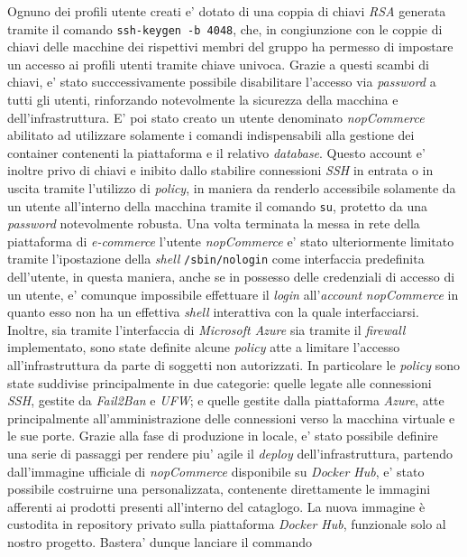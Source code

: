 \documentclass[a4paper]{report}
\begin{document}
		Ognuno dei profili utente creati e' dotato di una coppia di chiavi \emph{RSA} generata tramite il comando
		\texttt{ssh-keygen -b 4048}, che, in congiunzione con le coppie di chiavi delle macchine dei rispettivi membri
		del gruppo ha permesso di impostare un accesso ai profili utenti tramite chiave univoca. 
		Grazie a questi scambi di chiavi, e' stato succcessivamente possibile disabilitare l'accesso via \emph{password}
		a tutti gli utenti, rinforzando notevolmente la sicurezza della macchina e dell'infrastruttura. E' poi stato
		creato un utente denominato \emph{nopCommerce} abilitato ad utilizzare solamente i comandi indispensabili alla
		gestione dei container contenenti la piattaforma e il relativo \emph{database}. Questo account e' inoltre privo
		di chiavi e inibito dallo stabilire connessioni \emph{SSH} in entrata o in uscita tramite l'utilizzo di
		\emph{policy}, in maniera da renderlo accessibile solamente da un utente all'interno della macchina tramite il
		comando \texttt{su}, protetto da una \emph{password} notevolmente robusta. Una volta terminata la messa in rete
		della piattaforma di \emph{e-commerce} l'utente \emph{nopCommerce} e' stato ulteriormente limitato tramite
		l'ipostazione della \emph{shell} \texttt{/sbin/nologin} come interfaccia predefinita dell'utente, in questa
		maniera, anche se in possesso delle credenziali di accesso di un utente, e' comunque impossibile effettuare il
		\emph{login} all'\emph{account} \emph{nopCommerce} in quanto esso non ha un effettiva \emph{shell} interattiva
		con la quale interfacciarsi.
		Inoltre, sia tramite l'interfaccia di \emph{Microsoft Azure} sia tramite il \emph{firewall} implementato, sono
		state definite alcune \emph{policy} atte a limitare l'accesso all'infrastruttura da parte di soggetti non
		autorizzati. In particolare le \emph{policy} sono state suddivise principalmente in due categorie: quelle legate
		alle connessioni \emph{SSH}, gestite da \emph{Fail2Ban} e \emph{UFW}; e quelle gestite dalla piattaforma
		\emph{Azure}, atte principalmente all'amministrazione delle connessioni verso la macchina virtuale e le sue
		porte.
		Grazie alla fase di produzione in locale, e' stato possibile definire una serie di passaggi per rendere piu'
		agile il \emph{deploy} dell'infrastruttura, partendo dall'immagine ufficiale di \emph{nopCommerce} disponibile
		su \emph{Docker Hub}, e' stato possibile costruirne una personalizzata, contenente direttamente le immagini
		afferenti ai prodotti presenti all'interno del cataglogo.  La nuova immagine è custodita in repository privato
		sulla piattaforma \emph{Docker Hub}, funzionale solo al nostro progetto.  Bastera' dunque lanciare il commando
\end{document}

